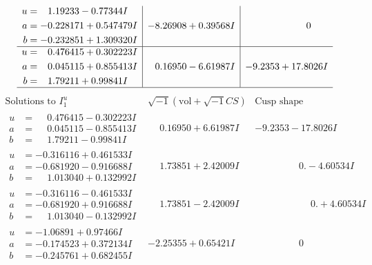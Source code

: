 \documentclass[1p]{elsarticle_modified}
\theoremstyle{definition}
\newcommand{\I}{\sqrt{-1}}
\begin{document}
$$\begin{array}{c|c|c}
\begin{aligned}
u &= \phantom{-}1.19233 - 0.77344 I \\
a &= -0.228171 + 0.547479 I \\
b &= -0.232851 + 1.309320 I\end{aligned}
 & -8.26908 + 0.39568 I & \phantom{-0.000000 } 0 \\ \hline\begin{aligned}
u &= \phantom{-}0.476415 + 0.302223 I \\
a &= \phantom{-}0.045115 + 0.855413 I \\
b &= \phantom{-}1.79211 + 0.99841 I\end{aligned}
 & \phantom{-}0.16950 - 6.61987 I & -9.2353 + 17.8026 I\\
 \hline 
 \end{array}$$\newpage$$\begin{array}{c|c|c}  
\text{Solutions to }I^u_{1}& \I (\text{vol} + \sqrt{-1}CS) & \text{Cusp shape}\\
 \hline 
\begin{aligned}
u &= \phantom{-}0.476415 - 0.302223 I \\
a &= \phantom{-}0.045115 - 0.855413 I \\
b &= \phantom{-}1.79211 - 0.99841 I\end{aligned}
 & \phantom{-}0.16950 + 6.61987 I & -9.2353 - 17.8026 I \\ \hline\begin{aligned}
u &= -0.316116 + 0.461533 I \\
a &= -0.681920 - 0.916688 I \\
b &= \phantom{-}1.013040 + 0.132992 I\end{aligned}
 & \phantom{-}1.73851 + 2.42009 I & \phantom{-0.000000 } 0. - 4.60534 I \\ \hline\begin{aligned}
u &= -0.316116 - 0.461533 I \\
a &= -0.681920 + 0.916688 I \\
b &= \phantom{-}1.013040 - 0.132992 I\end{aligned}
 & \phantom{-}1.73851 - 2.42009 I & \phantom{-0.000000 -}0. + 4.60534 I \\ \hline\begin{aligned}
u &= -1.06891 + 0.97466 I \\
a &= -0.174523 + 0.372134 I \\
b &= -0.245761 + 0.682455 I\end{aligned}
 & -2.25355 + 0.65421 I & \phantom{-0.000000 } 0 \\ \hline\begin{aligned}

\end{aligned}
\end{array}$$
\end{document}
